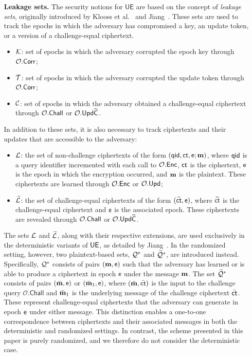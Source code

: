 \documentclass{fundam}
\begin{document}
\vspace{0.3cm}
\noindent\textbf{Leakage sets.} The security notions for $\mathsf{UE}$ are based on the concept of \textit{leakage sets}, originally introduced by Klooss et al.~\cite{klooss2019r} and Jiang~\cite{jiang2020}. These sets are used to track the epochs in which the adversary has compromised a key, an update token, or a version of a challenge-equal ciphertext.
%
\begin{itemize}
	\item $\mathcal{K}$: set of epochs in which the adversary corrupted the epoch key through $\mathcal{O}.\mathsf{Corr}$; 
	\item $\mathcal{T}$: set of epochs in which the adversary corrupted the update token through $\mathcal{O}.\mathsf{Corr}$; 
	\item $\mathcal{C}$: set of epochs in which the adversary obtained a challenge-equal ciphertext through $\mathcal{O}.\mathsf{Chall}$ or $\mathcal{O}.\mathsf{Upd}\widetilde{\mathsf{C}}$.
\end{itemize}
%
In addition to these sets, it is also necessary to track ciphertexts and their updates that are accessible to the adversary:
\begin{itemize}
	\item $\mathcal{L}$: the set of non-challenge ciphertexts of the form $(\mathsf{qid}, \mathsf{ct}, \mathsf{e}; \mathbf{m})$, where $\mathsf{qid}$ is a query identifier incremented with each call to $\mathcal{O}.\mathsf{Enc}$, $\mathsf{ct}$ is the ciphertext, $\mathsf{e}$ is the epoch in which the encryption occurred, and $\mathbf{m}$ is the plaintext. These ciphertexts are learned through $\mathcal{O}.\mathsf{Enc}$ or $\mathcal{O}.\mathsf{Upd}$;
	\item $\widetilde{\mathcal{L}}$: the set of challenge-equal ciphertexts of the form $(\widetilde{\mathsf{ct}}, \mathsf{e})$, where $\widetilde{\mathsf{ct}}$ is the challenge-equal ciphertext and $\mathsf{e}$ is the associated epoch. These ciphertexts are revealed through $\mathcal{O}.\mathsf{Chall}$ or $\mathcal{O}.\mathsf{Upd}\widetilde{\mathsf{C}}$.
\end{itemize} 
%
The sets $\mathcal{L}$ and $\widetilde{\mathcal{L}}$, along with their respective extensions, are used exclusively in the deterministic variants of $\mathsf{UE}$, as detailed by Jiang~\cite{jiang2020}. In the randomized setting, however, two plaintext-based sets, $\mathcal{Q}^{*}$ and $\widetilde{\mathcal{Q}}^{*}$, are introduced instead. Specifically, $\mathcal{Q}^{*}$ consists of pairs $(\mathbf{m}, \mathsf{e})$ such that the adversary has learned or is able to produce a ciphertext in epoch $\mathsf{e}$ under the message $\mathbf{m}$. The set $\widetilde{\mathcal{Q}}^{*}$ consists of pairs $(\bar{\mathbf{m}}, \mathsf{e})$ or $(\bar{\mathbf{m}}_1, \mathsf{e})$, where $(\bar{\mathbf{m}}, \bar{\mathsf{ct}})$ is the input to the challenge query $\mathcal{O}.\mathsf{Chall}$ and $\bar{\mathbf{m}}_1$ is the underlying message of the challenge ciphertext $\bar{\mathsf{ct}}$. These represent challenge-equal ciphertexts that the adversary can generate in epoch $\mathsf{e}$ under either message. This distinction enables a one-to-one correspondence between ciphertexts and their associated messages in both the deterministic and randomized settings. In contrast, the scheme presented in this paper is purely randomized, and we therefore do not consider the deterministic case.
\end{document}
